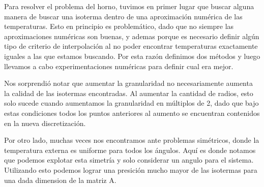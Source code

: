 Para resolver el problema del horno, tuvimos en primer lugar que buscar alguna manera de buscar una isoterma dentro de una aproximación numérica de las temperaturas. Esto en principio es problemático, dado que no siempre las aproximaciones numéricas son buenas, y ademas porque es necesario definir algún tipo de criterio de interpolación al no poder encontrar temperaturas exactamente iguales a las que estamos buscando. Por esta razón definimos dos métodos y luego llevamos a cabo experimentaciones numéricas para definir cual era mejor. 

Nos sorprendió notar que aumentar la granularidad no necesariamente aumenta la calidad de las isotermas encontradas. Al aumentar la cantidad de radios, esto solo sucede cuando aumentamos la granularidad en múltiplos de 2, dado que bajo estas condiciones todos los puntos anteriores al aumento se encuentran contenidos en la nueva discretización.

Por otro lado, muchas veces nos encontramos ante problemas simétricos, donde la temperatura externa es uniforme para todos los ángulos. Aquí es donde notamos que podemos explotar esta simetría y solo considerar un angulo para el sistema. Utilizando esto podemos lograr una presición mucho mayor de las isotermas para una dada dimension de la matriz A.